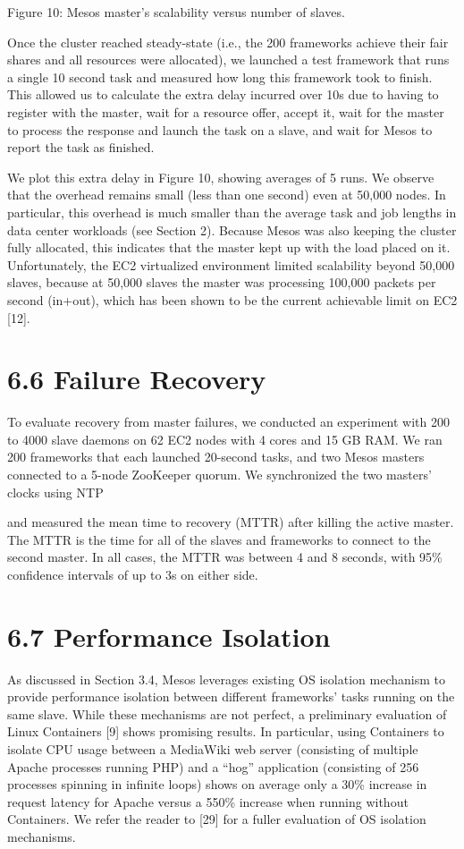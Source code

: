 \documentclass[
]{article}
\begin{document}
Figure 10: Mesos master's scalability versus number of slaves.

Once the cluster reached steady-state (i.e., the 200 frameworks achieve
their fair shares and all resources were allocated), we launched a test
framework that runs a single 10 second task and measured how long this
framework took to finish. This allowed us to calculate the extra delay
incurred over 10s due to having to register with the master, wait for a
resource offer, accept it, wait for the master to process the response
and launch the task on a slave, and wait for Mesos to report the task as
finished.

We plot this extra delay in Figure 10, showing averages of 5 runs. We
observe that the overhead remains small (less than one second) even at
50,000 nodes. In particular, this overhead is much smaller than the
average task and job lengths in data center workloads (see Section 2).
Because Mesos was also keeping the cluster fully allocated, this
indicates that the master kept up with the load placed on it.
Unfortunately, the EC2 virtualized environment limited scalability
beyond 50,000 slaves, because at 50,000 slaves the master was processing
100,000 packets per second (in+out), which has been shown to be the
current achievable limit on EC2 {[}12{]}.

\section{6.6 Failure Recovery}\label{failure-recovery}

To evaluate recovery from master failures, we conducted an experiment
with 200 to 4000 slave daemons on 62 EC2 nodes with 4 cores and 15 GB
RAM. We ran 200 frameworks that each launched 20-second tasks, and two
Mesos masters connected to a 5-node ZooKeeper quorum. We synchronized
the two masters' clocks using NTP

and measured the mean time to recovery (MTTR) after killing the active
master. The MTTR is the time for all of the slaves and frameworks to
connect to the second master. In all cases, the MTTR was between 4 and 8
seconds, with 95\% confidence intervals of up to 3s on either side.

\section{6.7 Performance Isolation}\label{performance-isolation}

As discussed in Section 3.4, Mesos leverages existing OS isolation
mechanism to provide performance isolation between different frameworks'
tasks running on the same slave. While these mechanisms are not perfect,
a preliminary evaluation of Linux Containers {[}9{]} shows promising
results. In particular, using Containers to isolate CPU usage between a
MediaWiki web server (consisting of multiple Apache processes running
PHP) and a ``hog'' application (consisting of 256 processes spinning in
infinite loops) shows on average only a 30\% increase in request latency
for Apache versus a 550\% increase when running without Containers. We
refer the reader to {[}29{]} for a fuller evaluation of OS isolation
mechanisms.
\end{document}
